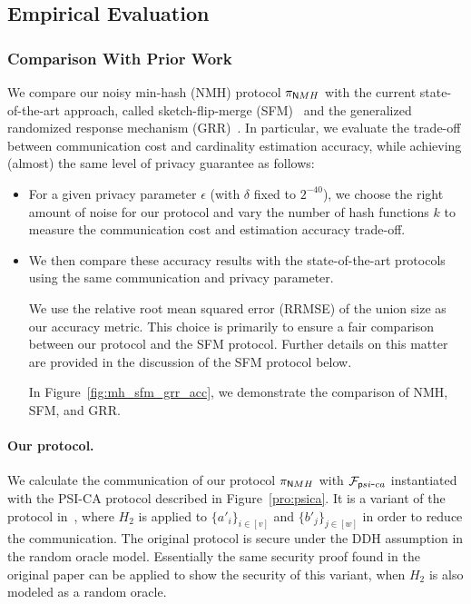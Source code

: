 \subsection{Empirical Evaluation}\label{sec:eval}
\subsubsection{Comparison With Prior Work} \label{sec:eval_comp}
We compare our noisy min-hash (NMH) protocol $\pi_{\mathsf NMH}$ with the current
state-of-the-art approach, called sketch-flip-merge
(SFM)~\cite{ICML:HehTinCor23} and the generalized randomized response mechanism
(GRR)~\cite{sisap:AumBouSch20}. %
In particular, we evaluate the trade-off between communication cost and cardinality estimation accuracy, while achieving (almost) the same level of privacy guarantee as follows: 
\begin{itemize}
    \item For a given privacy parameter $\epsilon$ (with $\delta$ fixed to $2^{-40}$), we choose the right amount of noise for our protocol and vary the number of hash functions $k$ to measure the communication cost and estimation accuracy trade-off.
    \item We then compare these accuracy results with the state-of-the-art protocols using the same communication and privacy parameter. 
    
    We use the relative root mean squared error (RRMSE) of the union size as our accuracy metric. This choice is primarily to ensure a fair comparison between our protocol and the SFM protocol. Further details on this matter are provided in the discussion of the SFM protocol below. 

    In Figure~\ref{fig:mh_sfm_grr_acc}, we demonstrate the comparison of NMH, SFM, and GRR. 

\end{itemize}
%



\paragraph{Our protocol.}
We calculate the communication of our protocol $\pi_{\mathsf NMH}$ with $\mathcal{F}_{{\mathsf psi\mbox{-}ca}}$ instantiated with the PSI-CA protocol described in
Figure~\ref{pro:psica}.
It is a variant of the protocol in~\cite{DGT12},
where $H_2$ is applied to $\{a'_i\}_{i \in [v]}$ and $\{b'_j\}_{j \in [w]}$ in
order to reduce the communication. 
The original protocol is secure under the DDH
assumption in the random oracle model. Essentially the same security proof found
in the original paper can be applied to show the security of this variant, when
$H_2$ is also modeled as a random oracle. 

